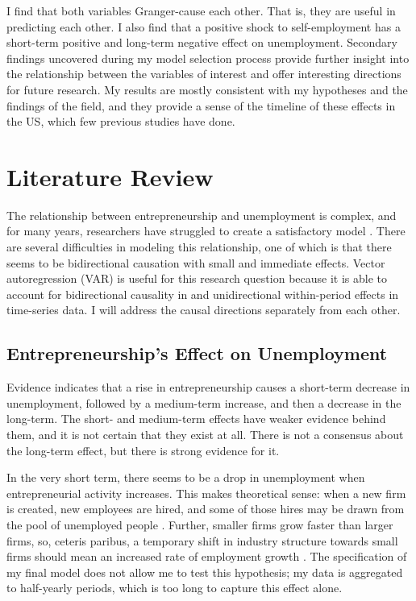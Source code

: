 \documentclass[]{ecca}
\begin{document}
I find that both variables Granger-cause each other. That is, they are useful in predicting each other. I also find that a positive shock to self-employment has a short-term positive and long-term negative effect on unemployment. Secondary findings uncovered during my model selection process provide further insight into the relationship between the variables of interest and offer interesting directions for future research. My results are mostly consistent with my hypotheses and the findings of the field, and they provide a sense of the timeline of these effects in the US, which few previous studies have done.

\section{Literature Review}

The relationship between entrepreneurship and unemployment is complex, and for many years, researchers have struggled to create a satisfactory model \citep{geroski95}. There are several difficulties in modeling this relationship, one of which is that there seems to be bidirectional causation with small and immediate effects. Vector autoregression (VAR) is useful for this research question because it is able to account for bidirectional causality in and unidirectional within-period effects in time-series data. I will address the causal directions separately from each other.

\subsection{Entrepreneurship's Effect on Unemployment}

Evidence indicates that a rise in entrepreneurship causes a short-term decrease in unemployment, followed by a medium-term increase, and then a decrease in the long-term. The short- and medium-term effects have weaker evidence behind them, and it is not certain that they exist at all. There is not a consensus about the long-term effect, but there is strong evidence for it.

In the very short term, there seems to be a drop in unemployment when entrepreneurial activity increases. This makes theoretical sense: when a new firm is created, new employees are hired, and some of those hires may be drawn from the pool of unemployed people \citep{fritsch04, pfeiffer00}. Further, smaller firms grow faster than larger firms, so, ceteris paribus, a temporary shift in industry structure towards small firms should mean an increased rate of employment growth \citep{evans87, audretsch01}. The specification of my final model does not allow me to test this hypothesis; my data is aggregated to half-yearly periods, which is too long to capture this effect alone.
\end{document}
